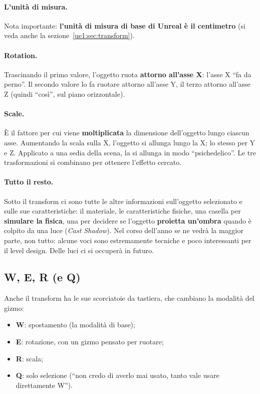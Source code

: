 \paragraph{L'unità di misura.} Nota importante: \textbf{l'unità di misura di
base di Unreal è il centimetro} (si veda anche la
sezione~\ref{ue1:sec:transform}).

\paragraph{Rotation.} Trascinando il primo valore, l'oggetto ruota
\textbf{attorno all'asse X}: l'asse X ``fa da perno''. Il secondo valore lo fa
ruotare attorno all'asse Y, il terzo attorno all'asse Z (quindi
``così'', sul piano orizzontale).

\paragraph{Scale.} È il fattore per cui viene \textbf{moltiplicata} la
dimensione dell'oggetto lungo ciascun asse. Aumentando la scala sulla X,
l'oggetto si allunga lungo la X; lo stesso per Y e Z. Applicato a una sedia
della scena, la si allunga in modo ``psichedelico''. Le tre trasformazioni si
combinano per ottenere l'effetto cercato.

\paragraph{Tutto il resto.} Sotto il transform ci sono tutte le altre
informazioni sull'oggetto selezionato e sulle sue caratteristiche: il
materiale, le caratteristiche fisiche, una casella per \textbf{simulare la
fisica}, una per decidere se l'oggetto \textbf{proietta un'ombra} quando è
colpito da una luce (\emph{Cast Shadow}). Nel corso dell'anno se ne vedrà la
maggior parte, non tutto: alcune voci sono estremamente tecniche e poco
interessanti per il level design. Delle luci ci si occuperà in futuro.

\subsection{W, E, R (e Q)}

Anche il transform ha le sue scorciatoie da tastiera, che cambiano la modalità
del gizmo:
\begin{itemize}
  \item \textbf{W}: spostamento (la modalità di base);
  \item \textbf{E}: rotazione, con un gizmo pensato per ruotare;
  \item \textbf{R}: scala;
  \item \textbf{Q}: solo selezione (``non credo di averlo mai usato, tanto vale
        usare direttamente W'').
\end{itemize}

